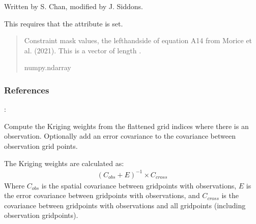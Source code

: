 \documentclass[letterpaper,10pt,english]{sphinxmanual}
\begin{document}
\begin{fulllineitems}
\begin{fulllineitems}
\sphinxAtStartPar
Written by S. Chan, modified by J. Siddons.

\sphinxAtStartPar
This requires that the  attribute is set.
\begin{quote}\begin{description}
\sphinxAtStartPar
{} \textendash{} Constraint mask values, the left\sphinxhyphen{}hand\sphinxhyphen{}side of equation A14 from
Morice et al. (2021). This is a vector of length .

\sphinxAtStartPar
numpy.ndarray

\end{description}\end{quote}
\subsubsection*{References}

\sphinxAtStartPar
{}: 

\end{fulllineitems}


\begin{fulllineitems}
\label{\detokenize{kriging:glomar_gridding.kriging.SimpleKriging.get_kriging_weights}}
\pysigstartsignatures
\pysiglinewithargsret
{}
{}
{}
\pysigstopsignatures
\sphinxAtStartPar
Compute the Kriging weights from the flattened grid indices where
there is an observation. Optionally add an error covariance to the
covariance between observation grid points.

\sphinxAtStartPar
The Kriging weights are calculated as:
\begin{equation*}
\begin{split}(C_{obs} + E)^{-1} \times C_{cross}\end{split}
\end{equation*}
\sphinxAtStartPar
Where \(C_{obs}\) is the spatial covariance between grid\sphinxhyphen{}points
with observations, \(E\) is the error covariance between grid\sphinxhyphen{}points
with observations, and \(C_{cross}\) is the covariance between
grid\sphinxhyphen{}points with observations and all grid\sphinxhyphen{}points (including observation
grid\sphinxhyphen{}points).


\end{fulllineitems}
\end{fulllineitems}
\end{document}
